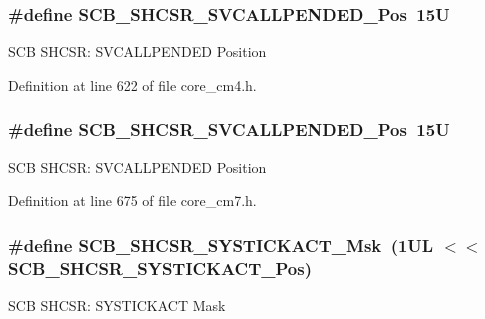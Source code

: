 \subsubsection[{\texorpdfstring{S\+C\+B\+\_\+\+S\+H\+C\+S\+R\+\_\+\+S\+V\+C\+A\+L\+L\+P\+E\+N\+D\+E\+D\+\_\+\+Pos}{SCB_SHCSR_SVCALLPENDED_Pos}}]{\setlength{\rightskip}{0pt plus 5cm}\#define S\+C\+B\+\_\+\+S\+H\+C\+S\+R\+\_\+\+S\+V\+C\+A\+L\+L\+P\+E\+N\+D\+E\+D\+\_\+\+Pos~15U}\hypertarget{group___c_m_s_i_s___s_c_b_ga2f93ec9b243f94cdd3e94b8f0bf43641}{}\label{group___c_m_s_i_s___s_c_b_ga2f93ec9b243f94cdd3e94b8f0bf43641}
S\+CB S\+H\+C\+SR\+: S\+V\+C\+A\+L\+L\+P\+E\+N\+D\+ED Position 

Definition at line 622 of file core\+\_\+cm4.\+h.

\subsubsection[{\texorpdfstring{S\+C\+B\+\_\+\+S\+H\+C\+S\+R\+\_\+\+S\+V\+C\+A\+L\+L\+P\+E\+N\+D\+E\+D\+\_\+\+Pos}{SCB_SHCSR_SVCALLPENDED_Pos}}]{\setlength{\rightskip}{0pt plus 5cm}\#define S\+C\+B\+\_\+\+S\+H\+C\+S\+R\+\_\+\+S\+V\+C\+A\+L\+L\+P\+E\+N\+D\+E\+D\+\_\+\+Pos~15U}\hypertarget{group___c_m_s_i_s___s_c_b_ga2f93ec9b243f94cdd3e94b8f0bf43641}{}\label{group___c_m_s_i_s___s_c_b_ga2f93ec9b243f94cdd3e94b8f0bf43641}
S\+CB S\+H\+C\+SR\+: S\+V\+C\+A\+L\+L\+P\+E\+N\+D\+ED Position 

Definition at line 675 of file core\+\_\+cm7.\+h.

\subsubsection[{\texorpdfstring{S\+C\+B\+\_\+\+S\+H\+C\+S\+R\+\_\+\+S\+Y\+S\+T\+I\+C\+K\+A\+C\+T\+\_\+\+Msk}{SCB_SHCSR_SYSTICKACT_Msk}}]{\setlength{\rightskip}{0pt plus 5cm}\#define S\+C\+B\+\_\+\+S\+H\+C\+S\+R\+\_\+\+S\+Y\+S\+T\+I\+C\+K\+A\+C\+T\+\_\+\+Msk~(1\+U\+L $<$$<$ S\+C\+B\+\_\+\+S\+H\+C\+S\+R\+\_\+\+S\+Y\+S\+T\+I\+C\+K\+A\+C\+T\+\_\+\+Pos)}\hypertarget{group___c_m_s_i_s___s_c_b_gafef530088dc6d6bfc9f1893d52853684}{}\label{group___c_m_s_i_s___s_c_b_gafef530088dc6d6bfc9f1893d52853684}
S\+CB S\+H\+C\+SR\+: S\+Y\+S\+T\+I\+C\+K\+A\+CT Mask 

